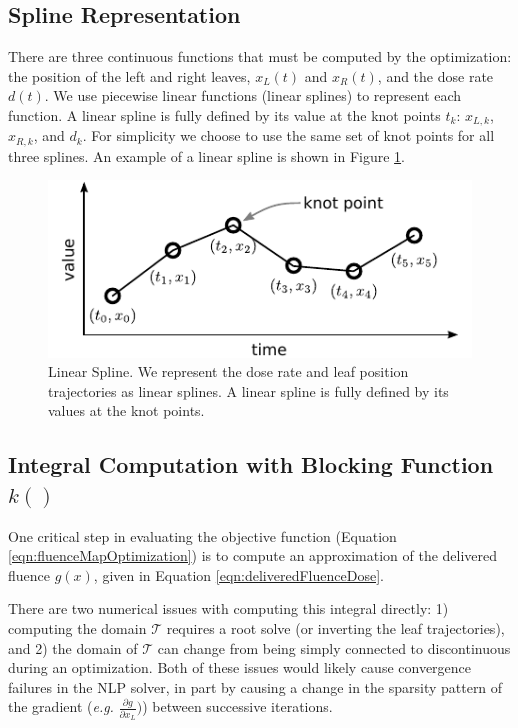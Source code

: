 \documentclass[12pt]{article}
\begin{document}
\subsection{Spline Representation}

There are three continuous functions that must be computed by the optimization: the position of the left and right leaves, $x_L(t)$ and $x_R(t)$, and the dose rate $d(t)$. We use piecewise linear functions (linear splines) to represent each function. A linear spline is fully defined by its value at the knot points $t_k$: $x_{L,k}$, $x_{R,k}$, and $d_k$. For simplicity we choose to use the same set of knot points for all three splines. An example of a linear spline is shown in Figure \ref{fig:linearSpline}.

\begin{figure}
  \centering
  \includegraphics{fig/linearSpline.pdf}
  \caption{Linear Spline. We represent the dose rate and leaf position trajectories as linear splines. A linear spline is fully defined by its values at the knot points. }
  \label{fig:linearSpline}
\end{figure}

\subsection{Integral Computation with Blocking Function $k()$}
\label{sec:IntegralComputationWithBlockingFunction}

One critical step in evaluating the objective function (Equation \ref{eqn:fluenceMapOptimization}) is to compute an approximation of the delivered fluence $g(x)$, given in Equation \ref{eqn:deliveredFluenceDose}.

There are two numerical issues with computing this integral directly: 
1) computing the domain $\mathcal{T}$ requires a root solve (or inverting the leaf trajectories), and 2) the domain of $\mathcal{T}$ can change from being simply connected to discontinuous during an optimization. Both of these issues would likely cause convergence failures in the NLP solver, in part by causing a change in the sparsity pattern of the gradient
(\textit{e.g.} $\tfrac{\partial g}{\partial x_L})$)
between successive iterations.
\end{document}
